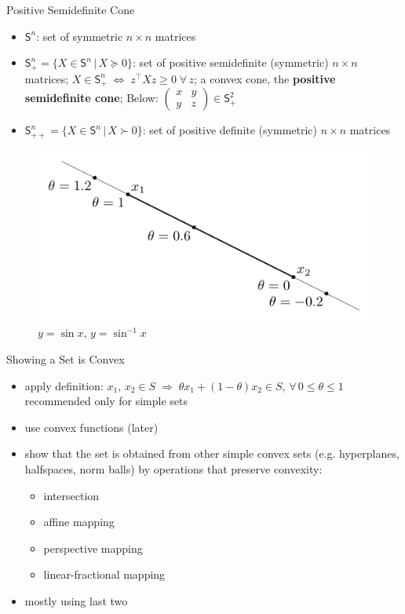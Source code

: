 \documentclass[10pt]{beamer}
\newcommand{\ds}{\displaystyle}
\newcommand{\ie}{\;\Longrightarrow\;}
\newcommand{\ifff}{\;\Longleftrightarrow\;}
\theoremstyle{definition}
\begin{document}
\begin{frame}{Positive Semidefinite Cone}
\begin{itemize}
  \item $\mathsf{S}^n$: set of symmetric $n\times n$ matrices
  \item $\ds\mathsf{S}^n_+ = \{X\in\mathsf{S}^n\,|\,X\succcurlyeq 0\}$: set of positive semidefinite (symmetric) $n\times n$ matrices; $\ds X\in\mathsf{S}^n_+ \ifff z^\top X z\geqslant 0\;\forall\,z$; a convex cone, the {\bf positive semidefinite cone}; Below: $\ds\begin{pmatrix}x & y \\ y & z\end{pmatrix}\in\mathsf{S}^2_+$
  \item $\ds\mathsf{S}^n_{++} = \{X\in\mathsf{S}^n\,|\,X\succ 0\}$: set of positive definite (symmetric) $n\times n$ matrices
\end{itemize}
\begin{figure}[!htbp]
  \centering
  \includegraphics[scale=0.5,page=12]{fig/note06/02.pdf}
  \caption{$y = \sin x$, $y = \sin^{-1} x$}
\end{figure}

\end{frame}

\begin{frame}{Showing a Set is Convex}

\begin{itemize}
  \item apply definition: $x_1$, $x_2\in S\ie \theta x_1 + (1 - \theta)x_2\in S$, $\forall\,0\leqslant\theta\leqslant 1$ \\ recommended only for simple sets
  \item use convex functions (later)
  \item show that the set is obtained from other simple convex sets (e.g. hyperplanes, halfspaces, norm balls) by operations that preserve convexity:
    \begin{itemize}
      \item intersection
      \item affine mapping
      \item perspective mapping
      \item linear-fractional mapping
    \end{itemize}
  \item mostly using last two
\end{itemize}

\end{frame}
\end{document}
